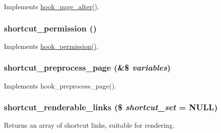 \label{shortcut_8module_aed1e5026d91d1e85d44b433c09dae17e}
Implements \hyperlink{group__hooks_gaa965aa8f38b48aed1a19c556c199145f}{hook\_\-page\_\-alter()}. \hypertarget{shortcut_8module_a61884ca7144fab3dd231ed2893ed847f}{
\subsubsection[{shortcut\_\-permission}]{\setlength{\rightskip}{0pt plus 5cm}shortcut\_\-permission ()}}
\label{shortcut_8module_a61884ca7144fab3dd231ed2893ed847f}
Implements \hyperlink{group__hooks_ga2b22b45f4925f2478412477bae329713}{hook\_\-permission()}. \hypertarget{shortcut_8module_a1dbc0d2f892a049896754e0f57a3015c}{
\subsubsection[{shortcut\_\-preprocess\_\-page}]{\setlength{\rightskip}{0pt plus 5cm}shortcut\_\-preprocess\_\-page (\&\$ {\em variables})}}
\label{shortcut_8module_a1dbc0d2f892a049896754e0f57a3015c}
Implements hook\_\-preprocess\_\-page(). \hypertarget{shortcut_8module_a707fddca9514c991a2a7d05deab36072}{
\subsubsection[{shortcut\_\-renderable\_\-links}]{\setlength{\rightskip}{0pt plus 5cm}shortcut\_\-renderable\_\-links (\$ {\em shortcut\_\-set} = {\ttfamily NULL})}}
\label{shortcut_8module_a707fddca9514c991a2a7d05deab36072}
Returns an array of shortcut links, suitable for rendering.


